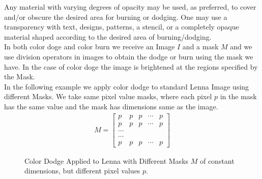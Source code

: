 \documentclass{article}
\begin{document}
Any material with varying degrees of opacity may be used, as preferred, to cover and/or obscure the 
desired area for burning or dodging. One may use a transparency with text, designs, patterns, a stencil, 
or a completely opaque material shaped according to the desired area of burning/dodging. \\

In both color doge and color burn we receive an Image $I$ and a mask $M$ and we use division operators
in images to obtain the dodge or burn using the mask we have. In the case of color doge the image
is brightened at the regions specified by the Mask. \\ 

In the following example we apply color dodge to standard Lenna Image using different Masks. We take 
same pixel value masks, where each pixel $p$ in the mask has the same value and the mask has dimensions
same as the image. \\

\begin{align*}
    M = \begin{bmatrix}
        p & p & p & \cdots & p \\
        p & p & p & \cdots & p \\
        \cdots \\
        \cdots \\
        p & p & p & \cdots & p
    \end{bmatrix}
\end{align*}

\begin{figure}[ht]
    \centering
    \qquad
    \qquad
    \qquad
    \qquad
    \label{fig:lenna-gaussian-blur}%
    \caption{Color Dodge Applied to Lenna with Different Masks $M$ of constant dimensions, but different pixel values $p$.}
\end{figure}
\end{document}
